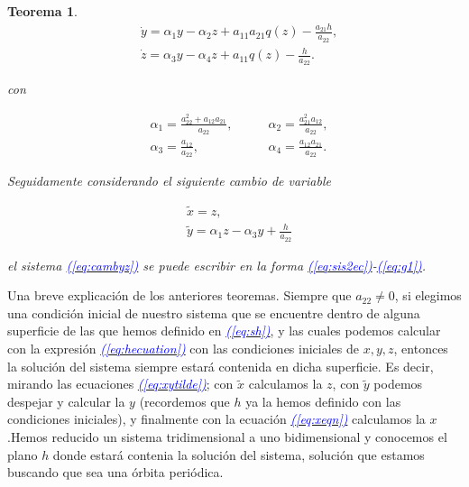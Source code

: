 \documentclass[12pt,a4paper]{report} %
\newtheorem{theorem}{Teorema}
\newcommand{\eref}[1]{\hyperref[#1]{\textcolor{blue}{\textit{(\ref*{#1})}}}}
\begin{document}
\begin{theorem}
		\begin{equation}
			\label{eq:cambyz}
			\begin{aligned}
				&\dot{y}=\alpha_1y-\alpha_2z+a_{11}a_{21}q(z)-\frac{a_{21}h}{a_{22}}, \\[2mm]
				&\dot{z}=\alpha_3y-\alpha_4z+a_{11}q(z)-\frac{h}{a_{22}}.
			\end{aligned}
		\end{equation}
		
		con
		
		\begin{equation}
			\label{eq:alphamatriz}
			\begin{aligned}
				&\alpha_1=\frac{a_{22}^2+a_{12}a_{21}}{a_{22}}, \qquad &\alpha_2=\frac{a_{21}^2a_{12}}{a_{22}},\\[2mm]
				&\alpha_3=\frac{a_{12}}{a_{22}}, \qquad &\alpha_4=\frac{a_{12}a_{21}}{a_{22}}.
			\end{aligned}
		\end{equation}\smallskip
		
		Seguidamente considerando el siguiente cambio de variable
		
		\begin{equation}
			\label{eq:xytilde}
			\begin{aligned}
				&\tilde{x}=z, \\[2mm]
				&\tilde{y}=\alpha_1z-\alpha_3y+\frac{h}{a_{22}}
			\end{aligned}
		\end{equation}\smallskip
		
		 el sistema \eref{eq:cambyz} se puede escribir en la forma \eref{eq:sis2ec}-\eref{eq:g1}.
		
	\end{theorem}
	
	\vspace{0.5cm}Una breve explicación de los anteriores teoremas. Siempre que $a_{22}\neq 0$, si elegimos una condición inicial de nuestro sistema que se encuentre dentro de alguna superficie de las que hemos definido en \eref{eq:sh}, y las cuales podemos calcular con la expresión \eref{eq:hecuation} con las condiciones iniciales de $x,y,z$, entonces la solución del sistema siempre estará contenida en dicha superficie. Es decir, mirando las ecuaciones \eref{eq:xytilde}; con $\tilde{x}$ calculamos la $z$, con $\tilde{y}$ podemos despejar y calcular la $y$ (recordemos que $h$ ya la hemos definido con las condiciones iniciales), y finalmente con la ecuación \eref{eq:xeqn} calculamos la $x$ .Hemos reducido un sistema tridimensional a uno bidimensional y conocemos el plano $h$ donde estará contenia la solución del sistema, solución que estamos buscando que sea una órbita periódica.
	
\end{document}
